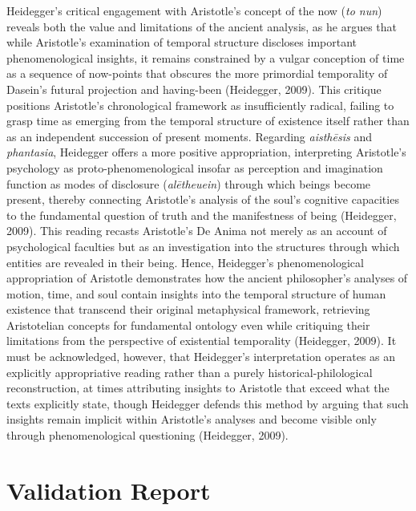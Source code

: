 \documentclass[12pt,a4paper]{article}
\begin{document}
Heidegger's critical engagement with Aristotle's concept of the now (\textit{to nun}) reveals both the value and limitations of the ancient analysis, as he argues that while Aristotle's examination of temporal structure discloses important phenomenological insights, it remains constrained by a vulgar conception of time as a sequence of now-points that obscures the more primordial temporality of Dasein's futural projection and having-been (Heidegger, 2009). This critique positions Aristotle's chronological framework as insufficiently radical, failing to grasp time as emerging from the temporal structure of existence itself rather than as an independent succession of present moments. Regarding \textit{aisthēsis} and \textit{phantasia}, Heidegger offers a more positive appropriation, interpreting Aristotle's psychology as proto-phenomenological insofar as perception and imagination function as modes of disclosure (\textit{alētheuein}) through which beings become present, thereby connecting Aristotle's analysis of the soul's cognitive capacities to the fundamental question of truth and the manifestness of being (Heidegger, 2009). This reading recasts Aristotle's De Anima not merely as an account of psychological faculties but as an investigation into the structures through which entities are revealed in their being. Hence, Heidegger's phenomenological appropriation of Aristotle demonstrates how the ancient philosopher's analyses of motion, time, and soul contain insights into the temporal structure of human existence that transcend their original metaphysical framework, retrieving Aristotelian concepts for fundamental ontology even while critiquing their limitations from the perspective of existential temporality (Heidegger, 2009). It must be acknowledged, however, that Heidegger's interpretation operates as an explicitly appropriative reading rather than a purely historical-philological reconstruction, at times attributing insights to Aristotle that exceed what the texts explicitly state, though Heidegger defends this method by arguing that such insights remain implicit within Aristotle's analyses and become visible only through phenomenological questioning (Heidegger, 2009).




\newpage
\part{Validation Report}
\end{document}
